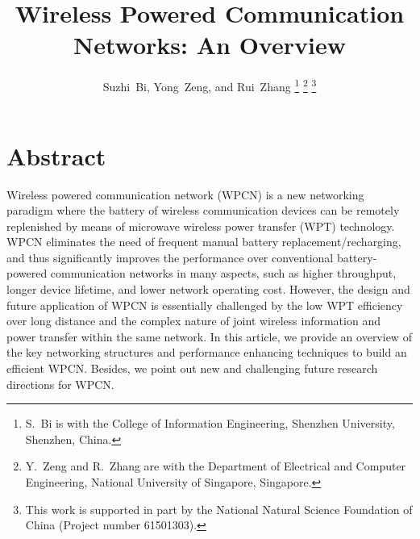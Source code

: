 \documentclass[journal, draftcls, one column, 12pt]{IEEEtran}
\begin{document}
\title{Wireless Powered Communication Networks: An Overview}
\author{Suzhi~Bi, Yong~Zeng, and Rui~Zhang
\thanks{S.~Bi is with the College of Information Engineering, Shenzhen University, Shenzhen, China.}
\thanks{Y.~Zeng and R.~Zhang are with the  Department of Electrical and Computer Engineering, National University of Singapore, Singapore.}
\thanks{This work is supported in part by the National Natural Science Foundation of China (Project number 61501303).}
}

\maketitle

\vspace{-1.8cm}

\section*{Abstract}
Wireless powered communication network (WPCN) is a new networking paradigm where the battery of wireless communication devices can be remotely replenished by means of microwave wireless power transfer (WPT) technology. WPCN eliminates the need of frequent manual battery replacement/recharging, and thus significantly improves the performance over conventional battery-powered communication networks in many aspects, such as higher throughput, longer device lifetime, and lower network operating cost. However, the design and future application of WPCN is essentially challenged by the low WPT efficiency over long distance and the complex nature of joint wireless information and power transfer within the same network. In this article, we provide an overview of the key networking structures and performance enhancing techniques to build an efficient WPCN. Besides, we point out new and challenging future research directions for WPCN.
\end{document}
